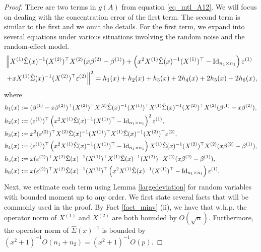 \begin{proof}
 There are two terms in $g(A)$ from equation \eqref{eq_mtl_A12}.
 We will focus on dealing with the concentration error of the first term. The second term is similar to the first and we omit the details.
 For the first term, we expand into several equations under various situations involving the random noise and the random-effect model.
 \begin{align}
 & \left\| X^{(1)} \hat\Sigma(x)^{-1} (X^{(2)})^\top X^{(2)} (x\beta^{(2)}-\beta^{(1)})+ \left(x^2 X^{(1)}\hat \Sigma(x)^{-1} (X^{(1)})^\top-\operatorname{Id}_{n_1\times n_1}\right)\varepsilon^{(1)} \right. \nonumber\\
		& \left. + x X^{(1)}\hat \Sigma(x)^{-1} (X^{(2)})^\top \varepsilon^{(2)} \right\|^2=h_1(x) + h_2(x) +h_3(x) + 2h_4(x) + 2h_5(x) + 2h_6(x), \label{expand_6}
 \end{align}
 where
 \begin{align*}
&h_1(x):=  (\beta^{(1)}-x\beta^{(2)})^\top (X^{(2)})^\top X^{(2)}  \hat\Sigma(x)^{-1}  (X^{(1)})^\top X^{(1)} \hat\Sigma(x)^{-1} (X^{(2)})^\top X^{(2)} (\beta^{(1)}-x\beta^{(2)})  ,\\
& h_2(x) := {(\varepsilon^{(1)})^\top \left(x^2 X^{(1)}\hat\Sigma(x)^{-1} (X^{(1)})^\top-\operatorname{Id}_{n_1\times n_1}\right)^2\varepsilon^{(1)}}  ,\\
& h_3(x):=  x^2 { (\varepsilon^{(2)} )^\top X^{(2)} \hat\Sigma(x)^{-1}  (X^{(1)})^\top X^{(1)}\hat\Sigma(x)^{-1} (X^{(2)})^\top \varepsilon^{(2)}} , \\
& h_4(x):=  (\varepsilon^{(1)})^\top\left(x^2 X^{(1)}\hat\Sigma(x)^{-1} (X^{(1)})^\top-\operatorname{Id}_{n_1\times n_1}\right) X^{(1)} \hat\Sigma(x)^{-1} (X^{(2)})^\top X^{(2)} (x\beta^{(2)}-\beta^{(1)}), \\
&h_5(x):=x (\varepsilon^{(2)})^\top X^{(2)}\hat\Sigma(x)^{-1} (X^{(1)})^\top X^{(1)} \hat\Sigma(x)^{-1} (X^{(2)})^\top X^{(2)} (x\beta^{(2)}-\beta^{(1)}),\\
&h_6(x):=x (\varepsilon^{(2)})^\top X^{(2)}\hat\Sigma(x)^{-1} (X^{(1)})^\top\left(x^2 X^{(1)}\hat\Sigma(x)^{-1} (X^{(1)})^\top-\operatorname{Id}_{n_1\times n_1}\right)\varepsilon^{(1)}.
\end{align*}
Next, we estimate each term using Lemma \ref{largedeviation} for random variables with bounded moment up to any order.
We first state several facts that will be commonly used in the proof.
By Fact \ref{fact_minv} (ii), we have that w.h.p. the operator norm of $X^{(1)}$ and $X^{(2)}$ are both bounded by $O(\sqrt{n})$.
Furthermore, the operator norm of $\hat\Sigma(x)^{-1}$ is bounded by $(x^2 + 1)^{-1} O(n_1 + n_2) = (x^2 + 1)^{-1} O(p)$.


\end{proof}
